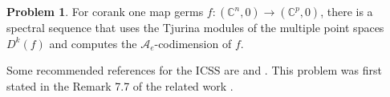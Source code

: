 \documentclass[a4paper,11pt]{amsart}
\theoremstyle{plain}
\theoremstyle{definition}
\newtheorem{problem}[theorem]{Problem}
\begin{document}
\begin{problem}
For corank one map germs $f:(\mathbb{C}^n,0)\rightarrow(\mathbb{C}^p,0)$, there is a spectral sequence that uses the Tjurina modules of the multiple point spaces $D^k(f)$ and computes the $\mathscr{A}_e$-codimension of $f$.
\end{problem}

Some recommended references for the ICSS are \cite{Goryunov1993,Houston2007,CisnerosMolina2022} and \cite[Chapter 2]{Robertothesis}. This problem was first stated in the Remark 7.7 of the related work \cite{GimenezConejero2022c}.



\end{document}
